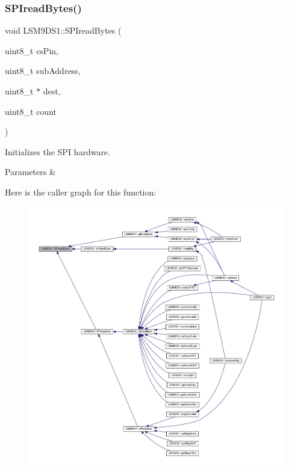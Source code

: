 \subsubsection{\texorpdfstring{S\+P\+Iread\+Bytes()}{SPIreadBytes()}}
{\footnotesize\ttfamily void L\+S\+M9\+D\+S1\+::\+S\+P\+Iread\+Bytes (\begin{DoxyParamCaption}\item[{uint8\+\_\+t}]{cs\+Pin,  }\item[{uint8\+\_\+t}]{sub\+Address,  }\item[{uint8\+\_\+t $\ast$}]{dest,  }\item[{uint8\+\_\+t}]{count }\end{DoxyParamCaption})\hspace{0.3cm}{\ttfamily [protected]}}



Initializes the S\+PI hardware. 


\begin{DoxyParams}{Parameters}
{\em } & \\
\hline
\end{DoxyParams}
Here is the caller graph for this function\+:
\nopagebreak
\begin{figure}[H]
\begin{center}
\leavevmode
\includegraphics[width=350pt]{classLSM9DS1_a26c0f164454eba84e6486033b7061d11_icgraph}
\end{center}
\end{figure}
\mbox{\label{classLSM9DS1_a83321c9d6ec50f6b9944907d2be482cd}} 
